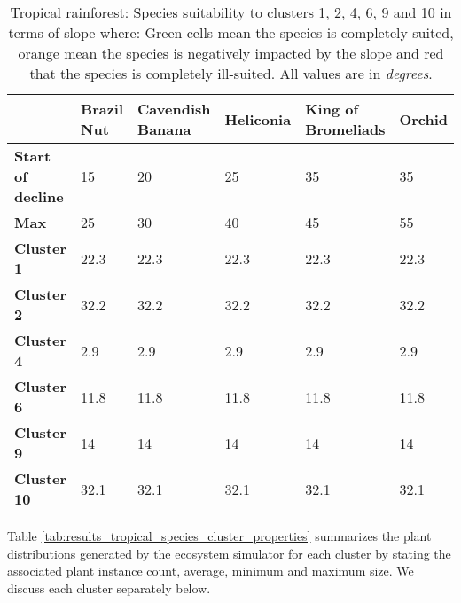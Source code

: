 \begin{table}[h]
  \centering
	    \begin{tabular}{|p{2cm}|p{2.5cm}|p{2.5cm}|p{2.5cm}|p{2.5cm}|p{2.5cm}|}
		\hline	
  	     & \textbf{Brazil Nut} & \textbf{Cavendish Banana} & \textbf{Heliconia} & \textbf{King of Bromeliads} & \textbf{Orchid} \\
  	    \hline	
		\textbf{Start of decline} & 
		15 & 
		20 & 
		25 &
		35 & 
		35 \\
		\hline
		\textbf{Max} & 
		25 &
		30 &
		40 &
		45 & 
		55 \\
		\hline
		\textbf{Cluster 1} & 
		\cellcolor{color_orange}22.3 &
		\cellcolor{color_orange}22.3 &
		\cellcolor{color_green}22.3 &
		\cellcolor{color_green}22.3 &
		\cellcolor{color_green}22.3 \\
		\hline
		\textbf{Cluster 2} & 
		\cellcolor{color_red}32.2 &
		\cellcolor{color_red}32.2 &
		\cellcolor{color_orange}32.2 &
		\cellcolor{color_green}32.2 &
		\cellcolor{color_green}32.2 \\
		\hline
		\textbf{Cluster 4} & 
		\cellcolor{color_green}2.9 & 
		\cellcolor{color_green}2.9 &
		\cellcolor{color_green}2.9 &
		\cellcolor{color_green}2.9 &
		\cellcolor{color_green}2.9 \\
		\hline
		\textbf{Cluster 6} & 
		\cellcolor{color_green}11.8 & 
		\cellcolor{color_green}11.8 &
		\cellcolor{color_green}11.8 &
		\cellcolor{color_green}11.8 &
		\cellcolor{color_green}11.8 \\
		\hline
		\textbf{Cluster 9} & 
		\cellcolor{color_green}14 & 
		\cellcolor{color_green}14 &
		\cellcolor{color_green}14 &
		\cellcolor{color_green}14 &
		\cellcolor{color_green}14 \\
		\hline
		\textbf{Cluster 10} & 
		\cellcolor{color_red}32.1 & 
		\cellcolor{color_red}32.1 &
		\cellcolor{color_orange}32.1 &
		\cellcolor{color_green}32.1 &
		\cellcolor{color_green}32.1 \\
		\hline
		\end{tabular}
		\caption{Tropical rainforest: Species suitability to clusters 1, 2, 4, 6, 9 and 10 in terms of slope where: Green cells mean the species is completely suited, orange mean the species is negatively impacted by the slope and red that the species is completely ill-suited. All values are in \textit{degrees}.}
	  \label{tab:results_tropical_species_slope_suitability}
\end{table}

Table \ref{tab:results_tropical_species_cluster_properties} summarizes the plant distributions generated by the ecosystem simulator for each cluster by stating the associated plant instance count, average, minimum and maximum size. We discuss each cluster separately below. \\

